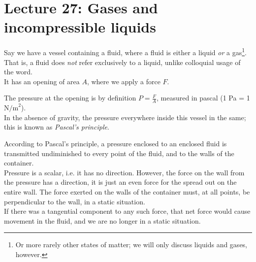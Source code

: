\section{Lecture 27: Gases and incompressible liquids}

Say we have a vessel containing a fluid, where a fluid is either a liquid \emph{or} a gas\footnote{Or more rarely other states of matter; we will only discuss liquids and gases, however.}. That is, a fluid does \emph{not} refer exclusively to a liquid, unlike colloquial usage of the word.\\
It has an opening of area $A$, where we apply a force $F$.

\begin{figure}[H]
  \centering
{}
\end{figure}


The pressure at the opening is by definition $\displaystyle P = \frac{F}{A}$, measured in pascal (1 Pa = 1 $\text{N/m}^2$).\\
In the absence of gravity, the pressure everywhere inside this vessel in the same; this is known as \emph{Pascal's principle}.

According to Pascal's principle, a pressure enclosed to an enclosed fluid is transmitted undiminished to every point of the fluid, and to the walls of the container.\\
Pressure is a scalar, i.e. it has no direction. However, the force on the wall from the pressure has a direction, it is just an even force for the spread out on the entire wall.
The force exerted on the walls of the container must, at all points, be perpendicular to the wall, in a static situation.\\
If there was a tangential component to any such force, that net force would cause movement in the fluid, and we are no longer in a static situation.

